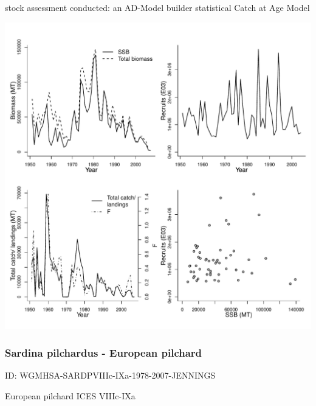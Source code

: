 stock assessment conducted: an AD-Model builder statistical Catch at Age Model 
\begin{center}
\vspace{-0.2cm}\includegraphics[scale=0.65]{../tex/figures/plot-DFO-PAC-HERRWCVANI-1951-2007-COLLIE.pdf}
\end{center}

\newpage
\subsubsection{Sardina pilchardus - European pilchard}
ID: WGMHSA-SARDPVIIIc-IXa-1978-2007-JENNINGS

European pilchard ICES VIIIc-IXa 

